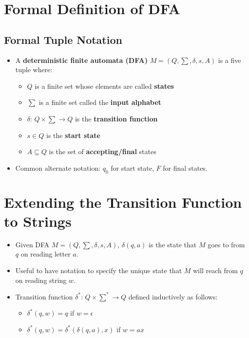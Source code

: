 \section{Formal Definition of DFA}

\subsection{Formal Tuple Notation}
\begin{itemize}
    \item A \textbf{deterministic finite automata (DFA)} $M = (Q, \sum, \delta, s, A)$ is a five tuple where:
    \begin{itemize}
        \item $Q$ is a finite set whose elements are called \textbf{states}
        \item $\sum$ is a finite set called the \textbf{input alphabet}
        \item $\delta$: $Q \times \sum \rightarrow Q$ is the \textbf{transition function}
        \item $s \in Q$ is the \textbf{start state}
        \item $A \subseteq Q$ is the set of \textbf{accepting/final} states
    \end{itemize}
    \item Common alternate notation: $q_0$ for start state, $F$ for final states.
\end{itemize}

\section{Extending the Transition Function to Strings}
\begin{itemize}
    \item Given DFA $M = (Q, \sum, \delta, s, A)$, $\delta(q, a)$ is the state that $M$ goes to from $q$ on reading letter $a$.
    \item Useful to have notation to specify the unique state that $M$ will reach from $q$ on reading string $w$.
    \item Transition function $\delta^{\ast}$: $Q \times \sum^{\ast} \rightarrow Q$ defined inductively as follows:
    \begin{itemize}
        \item $\delta^{\ast}(q,w) = q$ if $w = \epsilon$
        \item $\delta^{\ast}(q,w) = \delta^{\ast}(\delta(q,a),x)$ if $w = ax$
    \end{itemize}
\end{itemize}

